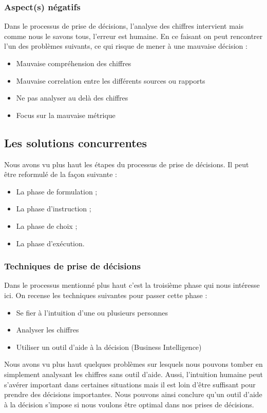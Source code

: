  \subsubsection{Aspect(s) négatifs}
 Dans le processus de prise de décisions, l'analyse des chiffres intervient mais comme nous le savons tous, l'erreur est humaine. En ce faisant on peut rencontrer l'un des problèmes suivants, ce qui risque de mener à une mauvaise décision :
 
 \begin{itemize}
     \item Mauvaise compréhension des chiffres
     \item Mauvaise correlation entre les différents sources ou rapports
     \item Ne pas analyser au delà des chiffres
     \item Focus sur la mauvaise métrique
 \end{itemize}
 
 
 \subsection{Les solutions concurrentes}
 Nous avons vu plus haut les étapes du processus de prise de décisions. Il peut être reformulé de la façon suivante :
 \begin{itemize}
     \item La phase de formulation ;
     \item La phase d’instruction ;
     \item La phase de choix ;
     \item La phase d’exécution.
 \end{itemize}
 \subsubsection{Techniques de prise de décisions}
 Dans le processus mentionné plus haut c’est la troisième phase qui nous intéresse ici. On recense les techniques suivantes pour passer cette phase :
 \begin{itemize}
     \item Se fier à l’intuition d’une ou plusieurs personnes
     \item Analyser les chiffres
     \item Utiliser un outil d’aide à la décision (Business Intelligence)
 \end{itemize}
 
 Nous avons vu plus haut quelques problèmes sur lesquels nous pouvons tomber en simplement analysant les chiffres sans outil d’aide. Aussi, l’intuition humaine peut s’avérer important dans certaines situations mais il est loin d’être suffisant pour prendre des décisions importantes. Nous pouvons ainsi conclure qu’un outil d’aide à la décision s’impose si nous voulons être optimal dans nos prises de décisions.
 
